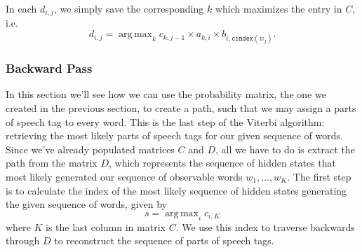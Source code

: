 \documentclass[12pt]{article}
\DeclareMathOperator*{\argmax}{arg\,max}
\begin{document}
In each $d_{i,j}$, we simply save the corresponding $k$ which maximizes the entry in $C$, i.e.
\[
  d_{i,j} = \argmax_k c_{k, j-1} \times a_{k,i} \times b_{i, \texttt{cindex}(w_j)}.
\]

\subsubsection{Backward Pass} In this section we'll see how we can use the probability matrix, the one we created in the previous section, to create a path, such that we may assign a parts of speech tag to every word. This is the last step of the Viterbi algorithm: retrieving the most likely parts of speech tags for our given sequence of words. Since we've already populated matrices $C$ and $D$, all we have to do is extract the path from the matrix $D$, which represents the sequence of hidden states that most likely generated our sequence of observable words $w_1, \ldots, w_K$. The first step is to calculate the index of the most likely sequence of hidden states generating the given sequence of words, given by
\[
  s = \argmax_i c_{i, K}
\]
where $K$ is the last column in matrix $C$. We use this index to traverse backwards through $D$ to reconstruct the sequence of parts of speech tags.
\end{document}
